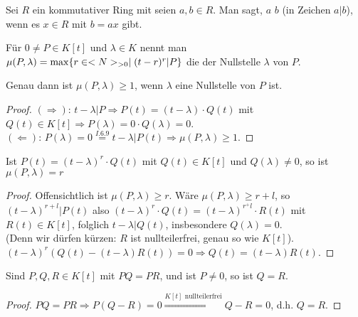 \begin{definition}[$a$ teilt $b$]
	Sei $R$ ein kommutativer Ring mit seien $a,b\in R$. Man sagt, $a$  $b$ (in Zeichen $a\vert b$), wenn es $x\in R$ mit $b=ax$ gibt.
\end{definition}

\begin{definition}[Vielfachheit]
	Für $0\neq P\in K[t]$ und $\lambda\in K$ nennt man $\mu(P,\lambda)=\max\{r\in <N>_{>0}\mid (t-r)^r\vert P\}$ die  der Nullstelle $\lambda$ von $P$.
\end{definition}

\begin{lemma}
	Genau dann ist $\mu(P,\lambda)\ge 1$, wenn $\lambda$ eine Nullstelle von $P$ ist.
\end{lemma}
\begin{proof}
	$(\Rightarrow)$: $t-\lambda\vert P\Rightarrow P(t)=(t-\lambda)\cdot Q(t)$ mit $Q(t)\in K[t]\Rightarrow P(\lambda)=0\cdot Q(\lambda)=0$. \\
	$(\Leftarrow)$: $P(\lambda)=0\overset{I.6.9}{=}t-\lambda\vert P(t)\Rightarrow \mu(P,\lambda)\ge 1$.
\end{proof}

\begin{lemma}
	Ist $P(t)=(t-\lambda)^r\cdot Q(t)$ mit $Q(t)\in K[t]$ und $Q(\lambda)\neq 0$, so ist $\mu(P,\lambda)=r$
\end{lemma}
\begin{proof}
	Offensichtlich ist $\mu(P,\lambda)\ge r$. Wäre $\mu(P,\lambda)\ge r+l$, so $(t-\lambda)^{r+l}\vert P(t)$ also $(t-\lambda)^r\cdot Q(t)=(t-\lambda)^{r^+l}\cdot R(t)$ mit $R(t)\in K[t]$, folglich $t-\lambda\vert Q(t)$, insbesondere $Q(\lambda)=0$. \\
	(Denn wir dürfen kürzen: $R$ ist nullteilerfrei, genau so wie $K[t]$). \\
	$(t-\lambda)^r(Q(t)-(t-\lambda)R(t))=0\Rightarrow Q(t)=(t-\lambda)R(t)$.
\end{proof}

\begin{lemma}
	Sind $P,Q,R\in K[t]$ mit $PQ=PR$, und ist $P\neq 0$, so ist $Q=R$.
\end{lemma}
\begin{proof}
	$PQ=PR\Rightarrow P(Q-R)=0\overset{K[t]\text{ nullteilerfrei}}{\Rightarrow} Q-R=0$, d.h. $Q=R$.
\end{proof}

